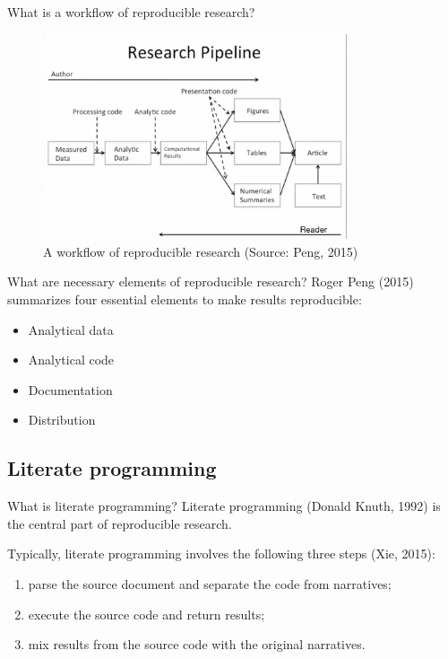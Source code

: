 \documentclass[presentation]{beamer}
\begin{document}
\begin{frame}[label={sec:org9bff12d}]{What is a workflow of reproducible research?}
\begin{figure}[htbp]
\centering
\includegraphics[width=0.8\textwidth,height=0.7\textheight]{figure/research_pipline.png}
\caption{A workflow of reproducible research (Source: Peng, 2015)}
\end{figure}
\end{frame}

\begin{frame}[label={sec:orga21a815}]{What are necessary elements of reproducible research?}
Roger Peng (2015) summarizes four essential elements to make results
reproducible:
\begin{itemize}
\item Analytical data
\item Analytical code
\item Documentation
\item Distribution
\end{itemize}
\end{frame}


\subsection{Literate programming}
\label{sec:org636c321}

\begin{frame}[label={sec:org47f2d4e}]{What is literate programming?}
Literate programming (Donald Knuth, 1992) is the central part of
reproducible research.

Typically, literate programming involves the following three steps
(Xie, 2015):
\begin{enumerate}
\item parse the source document and separate the code from narratives;
\item execute the source code and return results;
\item mix results from the source code with the original narratives.
\end{enumerate}
\end{frame}
\end{document}
